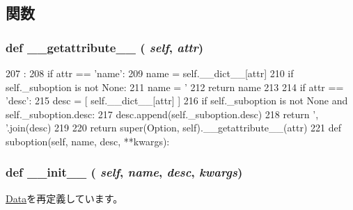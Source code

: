 \subsection{関数}
\hypertarget{classm5_1_1util_1_1jobfile_1_1Option_a21a3b336c73a0520c5bcb16ec9c94e38}{
\subsubsection[{\_\-\_\-getattribute\_\-\_\-}]{\setlength{\rightskip}{0pt plus 5cm}def \_\-\_\-getattribute\_\-\_\- ( {\em self}, \/   {\em attr})}}
\label{classm5_1_1util_1_1jobfile_1_1Option_a21a3b336c73a0520c5bcb16ec9c94e38}



\begin{DoxyCode}
207                                     :
208         if attr == 'name':
209             name = self.__dict__[attr]
210             if self._suboption is not None:
211                 name = '%
212             return name
213 
214         if attr == 'desc':
215             desc = [ self.__dict__[attr] ]
216             if self._suboption is not None and self._suboption.desc:
217                 desc.append(self._suboption.desc)
218             return ', '.join(desc)
219 
220         return super(Option, self).__getattribute__(attr)
221 
    def suboption(self, name, desc, **kwargs):
\end{DoxyCode}
\hypertarget{classm5_1_1util_1_1jobfile_1_1Option_ac775ee34451fdfa742b318538164070e}{
\subsubsection[{\_\-\_\-init\_\-\_\-}]{\setlength{\rightskip}{0pt plus 5cm}def \_\-\_\-init\_\-\_\- ( {\em self}, \/   {\em name}, \/   {\em desc}, \/   {\em kwargs})}}
\label{classm5_1_1util_1_1jobfile_1_1Option_ac775ee34451fdfa742b318538164070e}


\hyperlink{classm5_1_1util_1_1jobfile_1_1Data_ac775ee34451fdfa742b318538164070e}{Data}を再定義しています。


